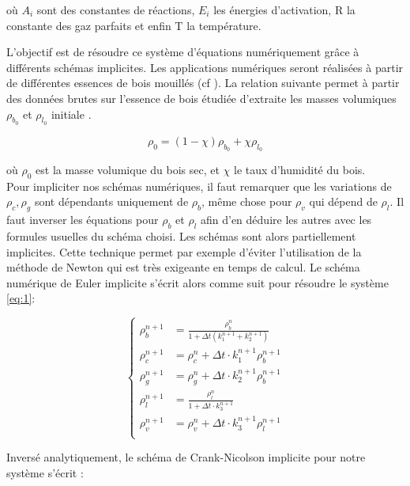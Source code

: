 \documentclass[a4paper,11pt]{article}
\begin{document}
où $A_i$ sont des constantes de réactions, $E_i$ les énergies d'activation, R la constante des gaz parfaits et enfin T la température.

L'objectif est de résoudre ce système d'équations numériquement grâce à différents schémas implicites. Les applications numériques seront réalisées à partir de différentes essences de bois mouillés (cf \cite{1}). La relation suivante permet à partir des données brutes sur l'essence de bois étudiée d'extraite les masses volumiques $\rho_{b_0}$ et $\rho_{l_0}$ initiale \cite{1}.

\begin{equation}\label{eq:3}
    \rho_0 = (1 - \chi)\rho_{b_0} + \chi\rho_{l_0}
\end{equation}

où $\rho_0$ est la masse volumique du bois sec, et $\chi$ le taux d'humidité du bois. \\


Pour impliciter nos schémas numériques, il faut remarquer que les variations de $\rho_c, \rho_g$ sont dépendants uniquement de $\rho_b$, même chose pour $\rho_v$ qui dépend de $\rho_l$. Il faut inverser les équations pour $\rho_b$ et $\rho_l$ afin d'en déduire les autres avec les formules usuelles du schéma choisi. Les schémas sont alors partiellement implicites. Cette technique permet par exemple d'éviter l'utilisation de la méthode de Newton qui est très exigeante en temps de calcul. Le schéma numérique de Euler implicite s'écrit alors comme suit pour résoudre le système \eqref{eq:1}:

\begin{equation}\label{eq:EI}
	\left\lbrace
		\begin{aligned}
			\rho_b^{n+1} &=  \frac{\rho_b^n}{1 + \Delta t(k_1^{n+1}+k_2^{n+1})} \\
                \rho_c^{n+1} &= \rho_c^n + \Delta t \cdot k_1^{n+1} \rho_b^{n+1}\\
                \rho_g^{n+1} &= \rho_g^n + \Delta t \cdot k_2^{n+1}\rho_b^{n+1}\\
                \rho_l^{n+1} &= \frac{\rho_l^n}{1 + \Delta t \cdot k_3^{n+1}} \\
                \rho_v^{n+1} &= \rho_v^n + \Delta t \cdot k_3^{n+1} \rho_l^{n+1} \\
		\end{aligned}
	\right.
\end{equation}


Inversé analytiquement, le schéma de Crank-Nicolson implicite pour notre système s'écrit :
\end{document}
